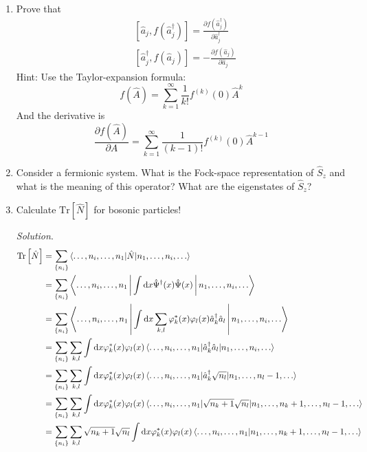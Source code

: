 \documentclass[11pt, a4paper]{article}
\newcommand{\dd}{\mathrm{d}}
\newcommand{\Tr}[1]{\mathrm{Tr}\left[#1\right]}
\begin{document}
\begin{enumerate}
    \item Prove that 
    \begin{align*}
        &[\hat a_j, f(\hat a_j^{\dagger})] = \frac{\partial f(\hat a_j^{\dagger})}{\partial \hat a_j^{\dagger}}\\
        &[\hat a_j^{\dagger}, f(\hat a_j)] = -\frac{\partial f(\hat a_j)}{\partial \hat a_j}
    \end{align*}
    Hint: Use the Taylor-expansion formula:
    \begin{equation*}
        f(\hat A) = \sum\limits_{k=1}^{\infty} \frac{1}{k!}f^{(k)}(0)\hat A^k
    \end{equation*}
    And the derivative is 
    \begin{equation*}
        \frac{\partial f(\hat A)}{\partial A} = \sum\limits_{k=1}^{\infty} \frac{1}{(k-1)!}f^{(k)}(0)\hat A^{k-1}
    \end{equation*}
    \item Consider a fermionic system. What is the Fock-space representation of $\hat S_z$ and what is the meaning
    of this operator? What are the eigenstates of $\hat S_z$?
    \item Calculate $\Tr {\hat N}$ for bosonic particles!
    \par\textit{Solution}.
    \begin{align*}
        \Tr{\hat N} &= \sum\limits_{\{n_i\}}\braket{\dots,n_i,\dots,n_1 | \hat N |n_1, \dots, n_i, \dots} \\
        & = \sum\limits_{\{n_i\}}\Braket{\dots,n_i,\dots,n_1 | \int\dd x \hat\Psi^{\dagger}(x)\hat\Psi(x) |n_1, \dots, n_i, \dots} \\
        & = \sum\limits_{\{n_i\}}\Braket{\dots,n_i,\dots,n_1 | \int\dd x \sum\limits_{k,l}\varphi^*_k(x)\varphi_l(x)
        \hat a_k^{\dagger}\hat a_l |n_1, \dots, n_i, \dots} \\
        & = \sum\limits_{\{n_i\}}\sum\limits_{k,l}\int\dd x \varphi^*_k(x)\varphi_l(x) \braket{\dots,n_i,\dots,n_1 | \hat a_k^{\dagger}\hat a_l |n_1, \dots, n_i, \dots} \\
        & = \sum\limits_{\{n_i\}}\sum\limits_{k,l}\int\dd x \varphi^*_k(x)\varphi_l(x) \braket{\dots,n_i,\dots,n_1 | \hat a_k^{\dagger}
        \sqrt{n_l} |n_1, \dots, n_l-1, \dots} \\
        & = \sum\limits_{\{n_i\}}\sum\limits_{k,l}\int\dd x \varphi^*_k(x)\varphi_l(x) \braket{\dots,n_i,\dots,n_1 | 
        \sqrt{n_k+1}\sqrt{n_l} |n_1, \dots, n_k+1, \dots, n_l-1, \dots} \\
        & = \sum\limits_{\{n_i\}}\sum\limits_{k,l} \sqrt{n_k+1}\sqrt{n_l} \int\dd x \varphi^*_k(x)\varphi_l(x) \braket{\dots,n_i,\dots,n_1 |n_1, \dots, n_k+1, \dots, n_l-1, \dots} \\

\end{align*}
\end{enumerate}
\end{document}

